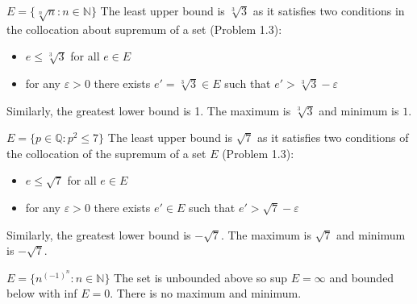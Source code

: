 \begin{numedquestion}
  
\end{numedquestion}

\begin{numedquestion}
  \begin{arabicparts}
    \item \(E=\{\sqrt[n]{n}: n \in \mathbb{N}\} \) \newline
    The least upper bound is \(\sqrt[3]{3}\) as it satisfies two conditions in the collocation about supremum of a set (Problem 1.3): 
    \begin{itemize}
        \item \(e \leq \sqrt[3]{3}\) for all \(e \in E\)
        \item for any \(\varepsilon>0\) there exists \(e' = \sqrt[3]{3} \in E\) such that \(e'>\sqrt[3]{3}-\varepsilon\) 
    \end{itemize}
     Similarly, the greatest lower bound is 1. The maximum is \(\sqrt[3]{3}\) and minimum is \(1\).
    \item \(E=\{p \in \mathbb{Q}: p^{2} \leq 7\}\) \newline
    The least upper bound is \(\sqrt{7}\) as it satisfies two conditions of the collocation of the supremum of a set \(E\) (Problem 1.3): 
    \begin{itemize}
        \item \(e \leq \sqrt{7}\) for all \(e \in E\)
        \item for any \(\varepsilon>0\) there exists \(e' \in E\) such that \(e'>\sqrt{7}-\varepsilon\) 
    \end{itemize}
     Similarly, the greatest lower bound is \(-\sqrt{7}\). The maximum is \(\sqrt{7}\) and minimum is \(-\sqrt{7}\).
    
    \item \(E= \{n^{(-1)^{n}}: n \in \mathbb{N}\}\)\newline
    The set is unbounded above so sup \(E=\infty\) and bounded below with inf \(E = 0\). There is no maximum and minimum. 
  \end{arabicparts}
\end{numedquestion}
    
